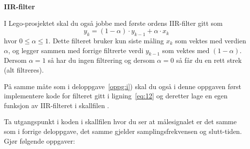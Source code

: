 \item
{\bf IIR-filter}

  I Lego-prosjektet skal du også jobbe med 
første ordens IIR-filter gitt som 
  \begin{equation}
  \label{eq:12}
 y_{k} = (1-\alpha)  {\cdot}y_{k-1} +  \alpha {\cdot}x_{k}
\end{equation}
hvor $0 {\leq} \alpha {\leq} 1$. Dette filteret bruker kun siste måling
$x_{k}$ som vektes med verdien $\alpha$, og legger sammen med forrige filtrerte
verdi $y_{k-1}$ som vektes med $(1{-}\alpha)$.  
Dersom $\alpha{=}1$ så har du ingen
filtrering og dersom $\alpha{=}0$ så får du en rett strek (alt
filtreres).

På samme måte som i deloppgave~\ref{oppg:i})  skal du også i denne
oppgaven først implementere kode for filteret gitt i
ligning~\eqref{eq:12} og deretter lage en egen funksjon av
IIR-filteret i skallfilen .

Ta utgangspunkt i koden i skallfilen hvor du ser at
målesignalet  er det samme som i forrige
deloppgave, det samme gjelder samplingsfrekvensen og slutt-tiden.
Gjør følgende oppgaver: 

